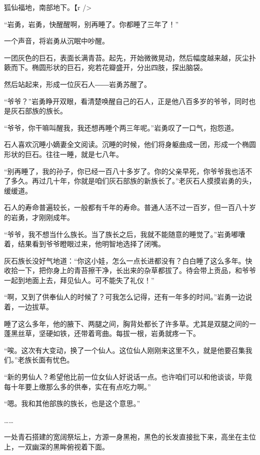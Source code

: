 
\begin{this_body}

狐仙福地，南部地下。【r />

“岩勇，岩勇，快醒醒啊，别再睡了。你都睡了三年了！”

一个声音，将岩勇从沉眠中吵醒。

一团灰色的巨石，表面长满青苔。起先，开始微微晃动，然后幅度越来越，灰尘扑簌而下。椭圆形状的巨石，宛若花瓣盛开，分出四肢，探出脑袋。

然后站起来，形成一位灰石人――岩勇苏醒了。

“爷爷？”岩勇睁开双眼，看清楚唤醒自己的石人，正是他八百多岁的爷爷，同时也是灰石部族的族长。

“爷爷，你干嘛叫醒我，我还想再睡个两三年呢。”岩勇叹了一口气，抱怨道。

石人喜欢沉睡小嫡妻全文阅读。沉睡的时候，他们将身躯曲成一团，形成一个椭圆形状的巨石。往往一睡，就是七八年。

“别再睡了，我的孙子，你已经一百八十多岁了。你的父亲早死，你爷爷我也活不了多久。再过几十年，你就是咱们灰石部族的新族长了。”老灰石人摸摸岩勇的头，缓缓道。

石人的寿命普遍较长，一般都有千年的寿命。普通人活不过一百岁，但一百八十岁的岩勇，才刚刚成年。

“爷爷，我不想当什么族长。当了族长之后，我就不能随意的睡觉了。”岩勇嘟囔着，结果看到爷爷瞪眼过来，他明智地选择了闭嘴。

灰石族长没好气地道：“你这小娃，怎么一点长进都没有？白白睡了这么多年。快收拾一下，把你身上的青苔擦干净，长出来的杂草都拔了。待会带上贡品，和爷爷一起到地面上去，拜见仙人。可不能失了礼仪！”

“啊，又到了供奉仙人的时候了？可我怎么记得，还有一年多的时间。”岩勇一边说着，一边拔草。

睡了这么多年，他的腋下、两腿之间，胸背处都长了许多草。尤其是双腿之间的一蓬黑丝草，坚硬如铁，还带着弯曲。每拔一根，岩勇就疼一下。

“唉。这次有大变动，换了一个仙人。这位仙人刚刚来这里不久，就是他要召集我们。”老族长面有忧色。

“新的男仙人？希望他比前一位女仙人好说话一点。也许咱们可以和他谈谈，毕竟每十年要上缴那么多的供奉，实在有点吃力啊。”

“嗯。我和其他部族的族长，也是这个意思。”

……

一处青石搭建的宽阔祭坛上，方源一身黑袍，黑色的长发直接批下来，高坐在主位上，一双幽深的黑眸俯视着下面。


\end{this_body}
